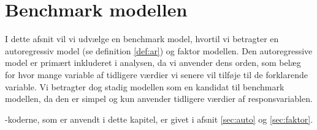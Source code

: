 \chapter{Benchmark modellen} \label{ch:benhcmarkmodel}
I dette afsnit vil vi udvælge en benchmark model, hvortil vi betragter en autoregressiv model (se definition \ref{def:ar}) og faktor modellen. 
Den autoregressive model er primært inkluderet i analysen, da vi anvender dens orden, som belæg for hvor mange variable af tidligere værdier vi senere vil tilføje til de forklarende variable.
Vi betragter dog stadig modellen som en kandidat til benchmark modellen, da den er simpel og kun anvender tidligere værdier af responsvariablen.

\Rlang-koderne, som er anvendt i dette kapitel, er givet i afsnit \ref{sec:auto} og \ref{sec:faktor}.





